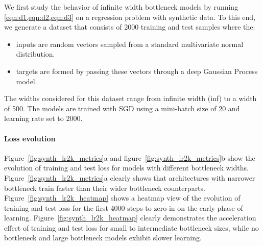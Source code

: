 \documentclass{article}
\theoremstyle{definition}
\theoremstyle{remark}
\renewcommand{\[}{\begin{eqnarray}}
\renewcommand{\]}{\end{eqnarray}}
\renewcommand{\[}{\begin{eqnarray}}
\renewcommand{\]}{\end{eqnarray}}
\begin{document}
We first study the behavior of infinite width bottleneck models by running \cref{eqn:d1,eqn:d2,eqn:d3} on a regression problem with synthetic data. To this end, we generate a dataset that consists of 2000 training and test samples where the:
\begin{itemize}
    \item inputs are random vectors sampled from a standard multivariate normal distribution.
    \item targets are formed by passing these vectors through a deep Gaussian Process model.
\end{itemize}
 The widths considered for this dataset range from infinite width (inf) to a width of 500. The models are trained with SGD using a mini-batch size of 20 and learning rate set to 2000.


\paragraph{Loss evolution}
Figure~\ref{fig:synth_lr2k_metrics}a and figure~\ref{fig:synth_lr2k_metrics}b show the evolution of training and test loss for models with different bottleneck widths. Figure~\ref{fig:synth_lr2k_metrics}a clearly shows that architectures with narrower bottleneck train faster than their wider bottleneck counterparts. Figure~\ref{fig:synth_lr2k_heatmap} shows a heatmap view of the evolution of training and test loss for the first 4000 steps to zero in on the early phase of learning. Figure~\ref{fig:synth_lr2k_heatmap} clearly demonstrates the acceleration effect of training and test loss for small to intermediate bottleneck sizes, while no bottleneck and large bottleneck models exhibit slower learning.
\end{document}
